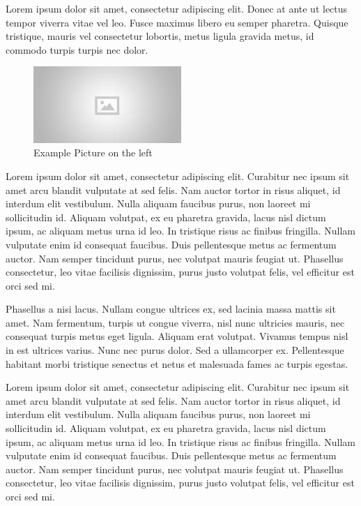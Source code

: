 \documentclass[
]{article}
\begin{document}
Lorem ipsum dolor sit amet, consectetur adipiscing elit. Donec at ante
ut lectus tempor viverra vitae vel leo. Fusce maximus libero eu semper
pharetra. Quisque tristique, mauris vel consectetur lobortis, metus
ligula gravida metus, id commodo turpis turpis nec dolor.

\begin{figure}

\includegraphics[width=0.5\textwidth,height=\textheight]{placeholder.jpg} \hfill{}

\caption{Example Picture on the left}

\end{figure}

Lorem ipsum dolor sit amet, consectetur adipiscing elit. Curabitur nec
ipsum sit amet arcu blandit vulputate at sed felis. Nam auctor tortor in
risus aliquet, id interdum elit vestibulum. Nulla aliquam faucibus
purus, non laoreet mi sollicitudin id. Aliquam volutpat, ex eu pharetra
gravida, lacus nisl dictum ipsum, ac aliquam metus urna id leo. In
tristique risus ac finibus fringilla. Nullam vulputate enim id consequat
faucibus. Duis pellentesque metus ac fermentum auctor. Nam semper
tincidunt purus, nec volutpat mauris feugiat ut. Phasellus consectetur,
leo vitae facilisis dignissim, purus justo volutpat felis, vel efficitur
est orci sed mi.

Phasellus a nisi lacus. Nullam congue ultrices ex, sed lacinia massa
mattis sit amet. Nam fermentum, turpis ut congue viverra, nisl nunc
ultricies mauris, nec consequat turpis metus eget ligula. Aliquam erat
volutpat. Vivamus tempus nisl in est ultrices varius. Nunc nec purus
dolor. Sed a ullamcorper ex. Pellentesque habitant morbi tristique
senectus et netus et malesuada fames ac turpis egestas.

Lorem ipsum dolor sit amet, consectetur adipiscing elit. Curabitur nec
ipsum sit amet arcu blandit vulputate at sed felis. Nam auctor tortor in
risus aliquet, id interdum elit vestibulum. Nulla aliquam faucibus
purus, non laoreet mi sollicitudin id. Aliquam volutpat, ex eu pharetra
gravida, lacus nisl dictum ipsum, ac aliquam metus urna id leo. In
tristique risus ac finibus fringilla. Nullam vulputate enim id consequat
faucibus. Duis pellentesque metus ac fermentum auctor. Nam semper
tincidunt purus, nec volutpat mauris feugiat ut. Phasellus consectetur,
leo vitae facilisis dignissim, purus justo volutpat felis, vel efficitur
est orci sed mi.
\end{document}
